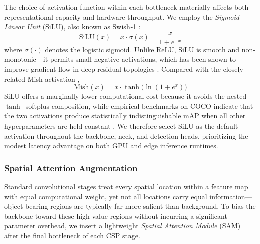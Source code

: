 The choice of activation function within each bottleneck
materially affects both representational capacity and hardware
throughput. We employ the \textit{Sigmoid Linear Unit} (SiLU),
also known as Swish-1 \cite{ramachandran2018searching}:
\begin{equation}
    \text{SiLU}(x) = x \cdot \sigma(x)
                    = \frac{x}{1 + e^{-x}}
    \label{eq:silu}
\end{equation}
where $\sigma(\cdot)$ denotes the logistic sigmoid. Unlike
ReLU, SiLU is smooth and non-monotonic---it permits small
negative activations, which has been shown to improve gradient
flow in deep residual topologies \cite{ramachandran2018searching}.
Compared with the closely related Mish activation
\cite{misra2020mish},
\begin{equation}
    \text{Mish}(x) = x \cdot \tanh\!\bigl(
        \ln(1 + e^{x})\bigr)
    \label{eq:mish}
\end{equation}
SiLU offers a marginally lower computational cost because it
avoids the nested $\tanh$--softplus composition, while
empirical benchmarks on COCO indicate that the two activations
produce statistically indistinguishable mAP when all other
hyperparameters are held constant
\cite{bochkovskiy2020yolov4}. We therefore select SiLU as the
default activation throughout the backbone, neck, and detection
heads, prioritizing the modest latency advantage on both GPU
and edge inference runtimes.

\subsubsection{Spatial Attention Augmentation}

Standard convolutional stages treat every spatial location
within a feature map with equal computational weight, yet not
all locations carry equal information---object-bearing regions
are typically far more salient than background. To bias the
backbone toward these high-value regions without incurring a
significant parameter overhead, we insert a lightweight
\textit{Spatial Attention Module} (SAM) after the final
bottleneck of each CSP stage.

